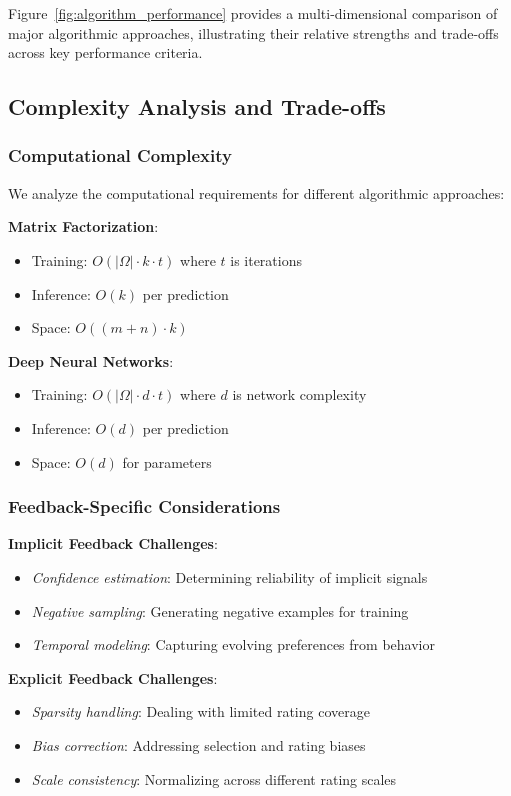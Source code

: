 Figure~\ref{fig:algorithm_performance} provides a multi-dimensional comparison of major algorithmic approaches, illustrating their relative strengths and trade-offs across key performance criteria.

\subsection{Complexity Analysis and Trade-offs}

\subsubsection{Computational Complexity}
We analyze the computational requirements for different algorithmic approaches:

\textbf{Matrix Factorization}:
\begin{itemize}
    \item Training: $O(|\Omega| \cdot k \cdot t)$ where $t$ is iterations
    \item Inference: $O(k)$ per prediction
    \item Space: $O((m+n) \cdot k)$
\end{itemize}

\textbf{Deep Neural Networks}:
\begin{itemize}
    \item Training: $O(|\Omega| \cdot d \cdot t)$ where $d$ is network complexity
    \item Inference: $O(d)$ per prediction
    \item Space: $O(d)$ for parameters
\end{itemize}

\subsubsection{Feedback-Specific Considerations}

\textbf{Implicit Feedback Challenges}:
\begin{itemize}
    \item \textit{Confidence estimation}: Determining reliability of implicit signals
    \item \textit{Negative sampling}: Generating negative examples for training
    \item \textit{Temporal modeling}: Capturing evolving preferences from behavior
\end{itemize}

\textbf{Explicit Feedback Challenges}:
\begin{itemize}
    \item \textit{Sparsity handling}: Dealing with limited rating coverage
    \item \textit{Bias correction}: Addressing selection and rating biases
    \item \textit{Scale consistency}: Normalizing across different rating scales
\end{itemize}

